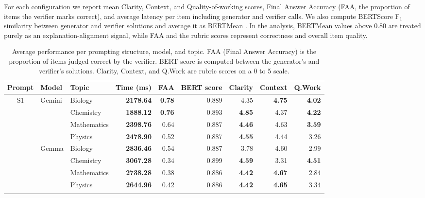 \documentclass[a4paper,conference]{IEEEtran}
\begin{document}
For each configuration we report mean Clarity, Context, and Quality-of-working scores, Final Answer Accuracy (FAA, the proportion of items the verifier marks correct), and average latency per item including generator and verifier calls. We also compute BERTScore F\(_1\) similarity between generator and verifier solutions and average it as BERTMean \cite{hanna2021finegrained}. In the analysis, BERTMean values above 0.80 are treated purely as an explanation-alignment signal, while FAA and the rubric scores represent correctness and overall item quality.

\begin{table}[!t]
\centering
\small
\caption{Average performance per prompting structure, model, and topic. FAA (Final Answer Accuracy) is the proportion of items judged correct by the verifier. BERT score is computed between the generator's and verifier's solutions. Clarity, Context, and Q.Work are rubric scores on a 0 to 5 scale.}
\label{tab:main-results}
\begin{tabular}{|c|l|l|r|r|r|r|r|r|}
\hline
\textbf{Prompt} & \textbf{Model} & \textbf{Topic} & \textbf{Time (ms)} & \textbf{FAA} & \textbf{BERT score} & \textbf{Clarity} & \textbf{Context} & \textbf{Q.Work} \\
\hline
\multirow{20}{*}{S1}
  & \multirow{4}{*}{Gemini} & Biology     & \textbf{2178.64} & \textbf{0.78} & 0.889 & 4.35 & \textbf{4.75} & \textbf{4.02} \\
  &                         & Chemistry   & \textbf{1888.12} & \textbf{0.76} & 0.893 & \textbf{4.85} & 4.37 & \textbf{4.22} \\
  &                         & Mathematics & \textbf{2398.76} & 0.64          & 0.887 & \textbf{4.46} & 4.63 & \textbf{3.59} \\
  &                         & Physics     & \textbf{2478.90} & 0.52          & 0.887 & \textbf{4.55} & 4.44 & 3.26 \\ \cline{2-9}
  & \multirow{4}{*}{Gemma}  & Biology     & \textbf{2836.46} & 0.54          & 0.887 & 3.78          & 4.60 & 2.99 \\
  &                         & Chemistry   & \textbf{3067.28} & 0.34          & 0.899 & \textbf{4.59} & 3.31 & \textbf{4.51} \\
  &                         & Mathematics & \textbf{2738.28} & 0.38          & 0.886 & \textbf{4.42} & \textbf{4.67} & 2.84 \\
  &                         & Physics     & \textbf{2644.96} & 0.42          & 0.886 & \textbf{4.42} & \textbf{4.65} & 3.34 \\ \cline{2-9}

\end{tabular}
\end{table}
\end{document}
